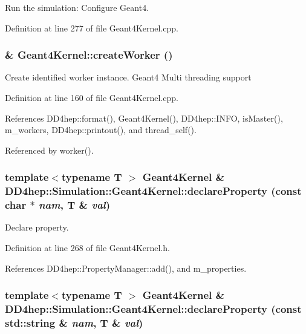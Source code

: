 Run the simulation: Configure Geant4. 

Definition at line 277 of file Geant4Kernel.cpp.\hypertarget{class_d_d4hep_1_1_simulation_1_1_geant4_kernel_a8d5bfc7d22e12f711950bd1c64173b74}{
\subsubsection[{createWorker}]{ \& Geant4Kernel::createWorker ()}}
\label{class_d_d4hep_1_1_simulation_1_1_geant4_kernel_a8d5bfc7d22e12f711950bd1c64173b74}


Create identified worker instance. Geant4 Multi threading support 

Definition at line 160 of file Geant4Kernel.cpp.

References DD4hep::format(), Geant4Kernel(), DD4hep::INFO, isMaster(), m\_\-workers, DD4hep::printout(), and thread\_\-self().

Referenced by worker().\hypertarget{class_d_d4hep_1_1_simulation_1_1_geant4_kernel_aa9f02684c5f94b400f6d2fbe47d3cb55}{
\subsubsection[{declareProperty}]{\setlength{\rightskip}{0pt plus 5cm}template$<$typename T $>$ {\bf Geant4Kernel} \& DD4hep::Simulation::Geant4Kernel::declareProperty (const char $\ast$ {\em nam}, \/  {\bf T} \& {\em val})}}
\label{class_d_d4hep_1_1_simulation_1_1_geant4_kernel_aa9f02684c5f94b400f6d2fbe47d3cb55}


Declare property. 

Definition at line 268 of file Geant4Kernel.h.

References DD4hep::PropertyManager::add(), and m\_\-properties.\hypertarget{class_d_d4hep_1_1_simulation_1_1_geant4_kernel_aadb88423f1b7ae7d5cc9e8cfab93c425}{
\subsubsection[{declareProperty}]{\setlength{\rightskip}{0pt plus 5cm}template$<$typename T $>$ {\bf Geant4Kernel} \& DD4hep::Simulation::Geant4Kernel::declareProperty (const std::string \& {\em nam}, \/  {\bf T} \& {\em val})}}
\label{class_d_d4hep_1_1_simulation_1_1_geant4_kernel_aadb88423f1b7ae7d5cc9e8cfab93c425}



